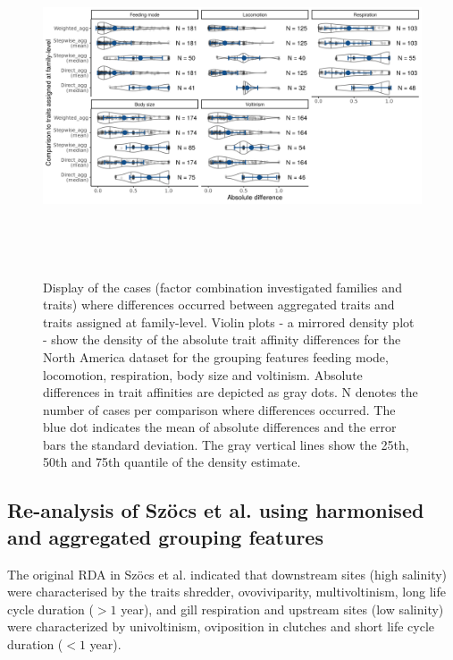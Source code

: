 \documentclass{article}
\begin{document}
\begin{figure}[H]
  \centering
  \includegraphics[width=16.5cm, height=10cm]{Deviances_trait_agg_pyne.png}
  \caption{Display of the cases (factor combination investigated families and traits) where differences occurred between aggregated traits and traits assigned at family-level. Violin plots - a mirrored density plot - show the density of the absolute trait affinity differences for the North America dataset for the grouping features feeding mode, locomotion, respiration, body size and voltinism. Absolute differences in trait affinities are depicted as gray dots. N denotes the number of cases per comparison where differences occurred. The blue dot indicates the mean of absolute differences and the error bars the standard deviation. The gray vertical lines show the 25th, 50th and 75th quantile of the density estimate.}
  \label{fig:diff_aggr_traits_pyne}
\end{figure}

\newpage 


\subsection*{Re-analysis of Szöcs et al. using harmonised and aggregated grouping features}

The original RDA in Szöcs et al. \cite{szocs_effects_2014} indicated that downstream sites (high salinity) were characterised by the traits shredder, ovoviviparity, multivoltinism, long life cycle duration ($> 1$ year), and gill respiration and upstream sites (low salinity) were characterized by univoltinism, oviposition in clutches and short life cycle duration ($< 1$ year). 
\end{document}
